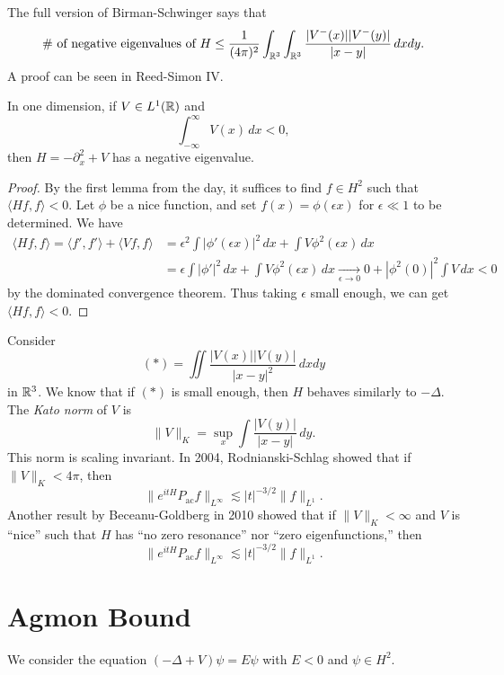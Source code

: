 \begin{remark}
  The full version of Birman-Schwinger says that
  \[
    \text{\# of negative eigenvalues of $H$}
    \le \frac{1}{(4\pi)^2} \int_{\mathbb{R}^3} \int_{\mathbb{R}^3} \frac{|V^-(x)| |V^-(y)|}{|x - y|} \,dx dy.
  \]
  A proof can be seen in Reed-Simon IV.
\end{remark}

\begin{lemma}
  In one dimension, if $V \in L^1(\mathbb{R})$ and
  \[
    \int_{-\infty}^\infty V(x)\, dx < 0,
  \]
  then $H = -\partial_x^2 + V$ has a negative
  eigenvalue.
\end{lemma}

\begin{proof}
  By the first lemma from the day, it suffices
  to find $f \in H^2$ such that $\langle Hf, f \rangle < 0$.
  Let $\phi$ be a nice function, and
  set $f(x) = \phi(\epsilon x)$ for
  $\epsilon \ll 1$ to be determined. We have
  \begin{align*}
    \langle Hf, f \rangle
    = \langle f', f' \rangle + \langle Vf, f \rangle
    &= \epsilon^2 \int |\phi'(\epsilon x)|^2\, dx
    + \int V \phi^2(\epsilon x)\, dx \\
    &= \epsilon \int |\phi'|^2\, dx
    + \int V \phi^2(\epsilon x) \, dx
    \xrightarrow[\epsilon \to 0]{} 0 + |\phi^2(0)|^2 \int V\, dx < 0
  \end{align*}
  by the dominated convergence theorem.
  Thus taking $\epsilon$ small enough, we can get
  $\langle Hf, f \rangle < 0$.
\end{proof}

\begin{remark}
  Consider
  \[
    (*) = \iint \frac{|V(x)| |V(y)|}{|x - y|^2}\, dxdy
  \]
  in $\mathbb{R}^3$. We know that if $(*)$ is small enough,
  then $H$ behaves similarly to $-\Delta$.
  The \emph{Kato norm} of $V$ is
  \[
    \|V\|_{K}
    = \sup_x \int \frac{|V(y)|}{|x - y|}\, dy.
  \]
  This norm is scaling invariant. In 2004,
  Rodnianski-Schlag showed that
  if $\|V\|_K < 4\pi$, then
  \[
    \|e^{itH} P_{\mathrm{ac}} f\|_{L^\infty}
    \lesssim |t|^{-3 / 2} \|f\|_{L^1}.
  \]
  Another result by Beceanu-Goldberg in 2010 showed
  that if $\|V\|_{K} < \infty$ and $V$ is ``nice''
  such that $H$ has
  ``no zero resonance'' nor ``zero eigenfunctions,''
  then
  \[
    \|e^{itH} P_{\mathrm{ac}} f\|_{L^\infty}
    \lesssim |t|^{-3 / 2} \|f\|_{L^1}.
  \]
\end{remark}

\section{Agmon Bound}
\begin{remark}
  We consider the equation $(-\Delta + V) \psi = E\psi$
  with $E < 0$ and $\psi \in H^2$.
\end{remark}

